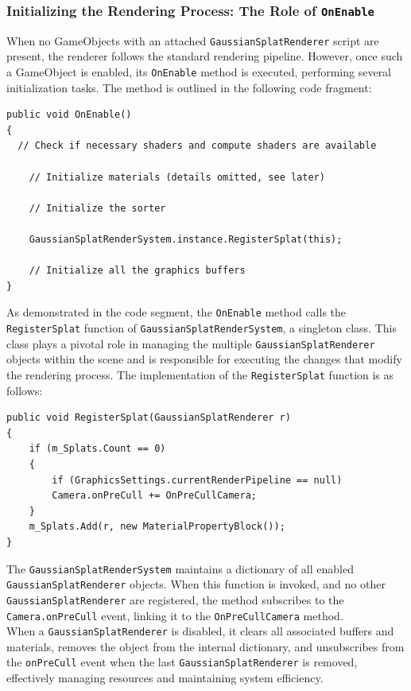 \documentclass[12pt]{article}
\begin{document}
\subsubsection{Initializing the Rendering Process: The Role of \texttt{OnEnable}}
When no GameObjects with an attached \texttt{GaussianSplatRenderer} script are present, the renderer follows the standard rendering pipeline. However, once such a GameObject is enabled, its \texttt{OnEnable} method is executed, performing several initialization tasks. The method is outlined in the following code fragment:
\lstset{style=sharpc}
\begin{lstlisting}[tabsize=2,caption=\texttt{onEnable} of \texttt{GaussianSplatRenderer}, label=code:rendereronenable,breaklines=true,breakatwhitespace=true,basicstyle=\ttfamily\footnotesize]
public void OnEnable()
{
  // Check if necessary shaders and compute shaders are available

	// Initialize materials (details omitted, see later)
	
	// Initialize the sorter
	
	GaussianSplatRenderSystem.instance.RegisterSplat(this);
	
	// Initialize all the graphics buffers
}
\end{lstlisting}
As demonstrated in the code segment, the \texttt{OnEnable} method calls the \linebreak\texttt{RegisterSplat} function of \texttt{GaussianSplatRenderSystem}, a singleton class. This class plays a pivotal role in managing the multiple \linebreak\texttt{GaussianSplatRenderer} objects within the scene and is responsible for executing the changes that modify the rendering process. The implementation of the \texttt{RegisterSplat} function is as follows:
\begin{lstlisting}[tabsize=2,caption=\texttt{RegisterSplat} of \texttt{GaussianSplatRenderSystem}, label=code:systemregister,breaklines=true,breakatwhitespace=true,basicstyle=\ttfamily\footnotesize]
public void RegisterSplat(GaussianSplatRenderer r)
{
	if (m_Splats.Count == 0)
	{
		if (GraphicsSettings.currentRenderPipeline == null)
		Camera.onPreCull += OnPreCullCamera;
	}
	m_Splats.Add(r, new MaterialPropertyBlock());
}
\end{lstlisting}
The \texttt{GaussianSplatRenderSystem} maintains a dictionary of all enabled \linebreak\texttt{GaussianSplatRenderer} objects. When this function is invoked, and no other \texttt{GaussianSplatRenderer} are registered, the method subscribes to the \texttt{Camera.onPreCull} event, linking it to the \texttt{OnPreCullCamera} method.\\
When a \texttt{GaussianSplatRenderer} is disabled, it clears all associated buffers and materials, removes the object from the internal dictionary, and unsubscribes from the \texttt{onPreCull} event when the last \texttt{GaussianSplatRenderer} is removed, effectively managing resources and maintaining system efficiency.
\end{document}

